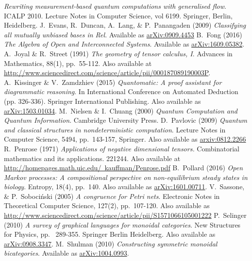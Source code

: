 \documentclass[11pt]{amsart}
\theoremstyle{remark}
\theoremstyle{definition}
\begin{document}
\begin{thebibliography}{100}
	\emph{Rewriting measurement-based quantum computations with generalised flow}. 
	ICALP 2010. 
	Lecture Notes in Computer Science, vol 6199. 
	Springer, Berlin, Heidelberg.
	J.~Evans, R.~Duncan, A.~Lang, \& P.~Panangaden
	(2009)
	\emph{Classifying all mutually unbiased bases in Rel}.
	Available as \href{https://arxiv.org/abs/0909.4453}{arXiv:0909.4453}
	B.~Fong
	(2016)
	\emph{The Algebra of Open and Interconnected Systems}. 
	Available as \href{https://arxiv.org/abs/arXiv:1609.05382}{arXiv:1609.05382}. 
	A.~Joyal \& R.~Street
	(1991)
	 \emph{The geometry of tensor calculus, I}. 
	 Advances in Mathematics, 
	 88(1), pp.~55-112.
	 Also available at \\ \href{http://www.sciencedirect.com/science/article/pii/000187089190003P}{http://www.sciencedirect.com/science/article/pii/000187089190003P}.
	A.~Kissinger \& V.~Zamdzhiev
	(2015)
	\emph{Quantomatic: A proof assistant for diagrammatic reasoning}. 
	In International Conference on Automated Deduction 
	(pp. 326-336). 
	Springer International Publishing.
	Also available as \href{https://arxiv.org/abs/1503.01034}{arXiv:1503.01034}.
	M.~Nielsen \& I.~Chuang
	(2000)
	\emph{Quantum Computation and Quantum Information}.
	Cambridge University Press.
	D.~Pavlovic
	(2009)
	\emph{Quantum and classical structures in nondeterministic computation}.
	Lecture Notes in Computer Science, 5494, pp.~143-157,
	Springer.
	Also available as \href{https://arxiv.org/abs/0812.2266}{arxiv:0812.2266}
	R.~Penrose
	(1971)
	\emph{Applications of negative dimensional tensors.} 
	Combinatorial mathematics and its applications.  221244.  
	Also available at \href{http://homepages.math.uic.edu/~kauffman/Penrose.pdf}{http://homepages.math.uic.edu/~kauffman/Penrose.pdf}
	B.~Pollard
	(2016)
	\emph{Open Markov processes: A compositional perspective on non-equilibrium steady states in biology}. 
	Entropy, 18(4), pp.~140. 
	Also available as \href{https://arxiv.org/abs/1601.00711}{arXiv:1601.00711}.
	V.~Sassone, \& P.~Soboci\'{n}ski
	(2005)
	\emph{A congruence for Petri nets}. 
	Electronic Notes in Theoretical Computer Science, 
	127(2), pp.~107-120.
	Also available as \href{http://www.sciencedirect.com/science/article/pii/S1571066105001222}{http://www.sciencedirect.com/science/article/pii/S1571066105001222}
	P.~Selinger
	(2010)
	\emph{A survey of graphical languages for monoidal categories}. 
	New Structures for Physics, pp. ~289-355. 
	Springer Berlin Heidelberg. 
	Also available as \href{https://arxiv.org/abs/0908.3347}{arXiv:0908.3347}.
	M.~Shulman
	(2010)
	\emph{Constructing symmetric monoidal bicategories}.
	Available as \href{http://arxiv.org/abs/1004.0993}{arXiv:1004.0993}.
	
	

\end{thebibliography}


%
%
\end{document}
